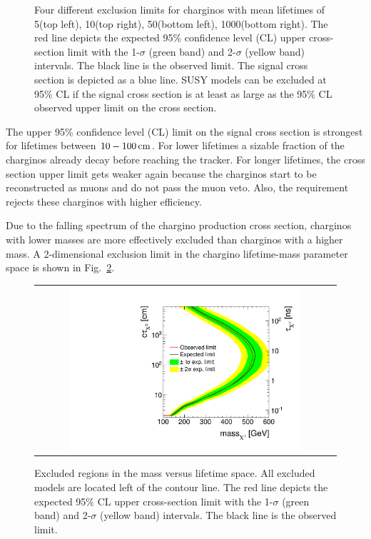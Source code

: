 \begin{figure}[!h]
\begin{tabular}{c}
  \end{tabular}
  \caption{Four different \CLs exclusion limits for charginos with mean lifetimes of 5\cm (top left), 10\cm (top right), 50\cm (bottom left), 1000\cm (bottom right).
           The red line depicts the expected 95\% confidence level (CL) upper cross-section limit with the 1-$\sigma$ (green band) and 2-$\sigma$ (yellow band) intervals.
           The black line is the observed limit.
           The signal cross section is depicted as a blue line. 
           SUSY models can be excluded at 95\% CL if the signal cross section is at least as large as the 95\% CL observed upper limit on the cross section.}
  \label{fig:1dLimits}
\end{figure} 
The upper 95\% confidence level (CL) limit on the signal cross section is strongest for lifetimes between $10-100\,\text{cm}$.
For lower lifetimes a sizable fraction of the charginos already decay before reaching the tracker.
For longer lifetimes, the cross section upper limit gets weaker again because the charginos start to be reconstructed as muons and do not pass the muon veto.
Also, the \ecalo requirement rejects these charginos with higher efficiency.

Due to the falling spectrum of the chargino production cross section, charginos with lower masses are more effectively excluded than charginos with a higher mass.
A 2-dimensional exclusion limit in the chargino lifetime-mass parameter space is shown in Fig.~\ref{fig:2dLimit}.
\begin{figure}[!t]
  \centering 
  \begin{tabular}{c}
    \includegraphics[width=0.79\textwidth]{figures/analysis/Interpretation/ExclusionLimits/LimitPlot_2d_log_cm.pdf} 
  \end{tabular}
  \caption{Excluded regions in the mass versus lifetime space.
           All excluded models are located left of the contour line.
            The red line depicts the expected 95\% CL upper cross-section limit with the 1-$\sigma$ (green band) and 2-$\sigma$ (yellow band) intervals.
           The black line is the observed limit.}
  \label{fig:2dLimit}
\end{figure} 

